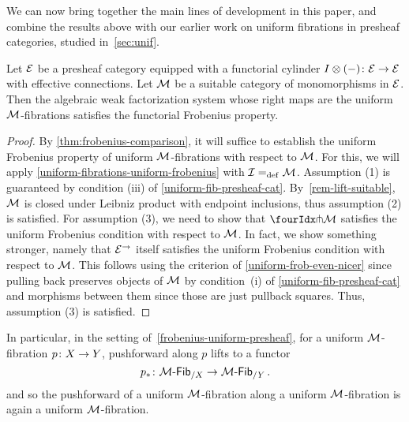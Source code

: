 \documentclass[reqno,10pt,a4paper,oneside,draft]{amsart}
\begin{document}
We can now bring together the main lines of development in this paper, and 
combine the results above with our earlier work 
on uniform fibrations in presheaf categories,  studied in~\cref{sec:unif}.

\begin{theorem} 
\label{frobenius-uniform-presheaf}
Let $\catE$ be a presheaf category equipped with a functorial cylinder
$I \otimes (-) \co \catE \to \catE$ with effective connections. 
Let $\cal{M}$ be a suitable category of monomorphisms in $\catE$. 
Then the algebraic weak factorization system 
whose right maps are the uniform $\cal{M}$-fibrations satisfies
the functorial Frobenius property. 
\end{theorem}

\begin{proof} 
By \cref{thm:frobenius-comparison}, it will suffice to establish the uniform Frobenius property of uniform $\cal{M}$-fibrations with respect to $\cal{M}$.
For this, we will apply \cref{uniform-fibrations-uniform-frobenius} with $\cal{I} \defeq \cal{M}$.
Assumption (1) is guaranteed by condition (iii) of \cref{uniform-fib-presheaf-cat}. 
By~\cref{rem-lift-suitable}, $\cal{M}$ is closed under Leibniz product with endpoint inclusions, thus assumption (2) is satisfied. For assumption (3), we need to show that $\liftr{\cal{M}}$ satisfies the uniform Frobenius condition with respect to $\cal{M}$.
In fact, we show something stronger, namely that $\catE^\to$ itself satisfies the uniform Frobenius condition with respect to $\cal{M}$.
This follows using the criterion of \cref{uniform-frob-even-nicer} since pulling back preserves objects of $\cal{M}$ by condition~(i) of \cref{uniform-fib-presheaf-cat} and morphisms between them since those are just pullback squares. Thus, assumption (3) is satisfied.
\end{proof} 

In particular, in the setting of~\cref{frobenius-uniform-presheaf}, for  a uniform $\cal{M}$-fibration $p \co X \to Y$, pushforward along $p$ lifts to a functor 
\[
p_* \co \Fib{\cal{M}}_{/X} \to \Fib{\cal{M}}_{/Y} \, .
\]
and so the pushforward of a uniform $\cal{M}$-fibration along a uniform $\cal{M}$-fibration is again a uniform $\cal{M}$-fibration.
\end{document}
